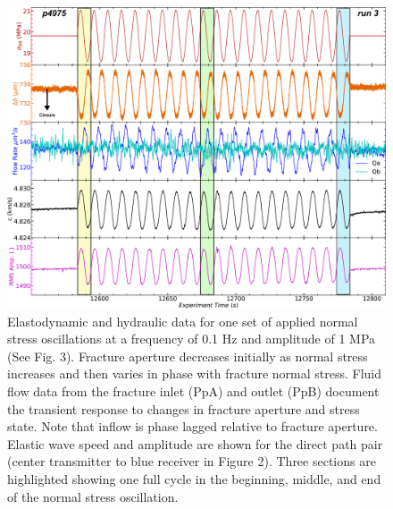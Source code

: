 \documentclass[letterpaper,10pt]{article}
\begin{document}
	\newpage
	
	
	
	\begin{figure}[ht]
		\centering
		\includegraphics[width=0.9\columnwidth]{NS_p4975_run3}
		\caption[]{Elastodynamic and hydraulic data for one set of applied normal stress oscillations at a frequency of 0.1 Hz and amplitude of 1 MPa (See Fig. 3). Fracture aperture decreases initially as normal stress increases and then varies in phase with fracture normal stress. Fluid flow data from the fracture inlet (PpA) and outlet (PpB) document the transient response to changes in fracture aperture and stress state. Note that inflow is phase lagged relative to fracture aperture. Elastic wave speed and amplitude are shown for the direct path pair (center transmitter to blue receiver in Figure 2). Three sections are highlighted showing one full cycle in the beginning, middle, and end of the normal stress oscillation. }
		\label{fig:NS_p4975_run3b_01Hz}
	\end{figure}
	
\end{document}
